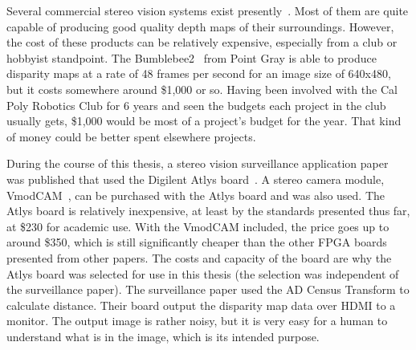Several commercial stereo vision systems exist presently~\cite{xilinxSpartan3APaper}. Most of them are quite capable of producing good quality depth maps of their surroundings. However, the cost of these products can be relatively expensive, especially from a club or hobbyist standpoint. The Bumblebee2~\cite{bumblebee} from Point Gray is able to produce disparity maps at a rate of 48 frames per second for an image size of 640x480, but it costs somewhere around \$1,000 or so. Having been involved with the Cal Poly Robotics Club for 6 years and seen the budgets each project in the club usually gets, \$1,000 would be most of a project's budget for the year. That kind of money could be better spent elsewhere projects.

During the course of this thesis, a stereo vision surveillance application paper~\cite{surveillance} was published that used the Digilent Atlys board~\cite{atlysBoard}. A stereo camera module, VmodCAM~\cite{vmodcam}, can be purchased with the Atlys board and was also used. The Atlys board is relatively inexpensive, at least by the standards presented thus far, at \$230 for academic use. With the VmodCAM included, the price goes up to around \$350, which is still significantly cheaper than the other FPGA boards presented from other papers. The costs and capacity of the board are why the Atlys board was selected for use in this thesis (the selection was independent of the surveillance paper). The surveillance paper used the AD Census Transform to calculate distance. Their board output the disparity map data over HDMI to a monitor. The output image is rather noisy, but it is very easy for a human to understand what is in the image, which is its intended purpose.